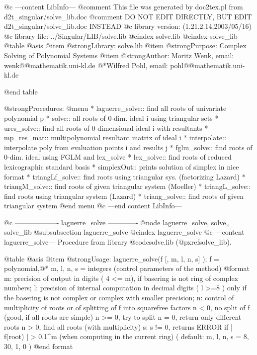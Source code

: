@c ---content LibInfo---
@comment This file was generated by doc2tex.pl from d2t_singular/solve_lib.doc
@comment DO NOT EDIT DIRECTLY, BUT EDIT d2t_singular/solve_lib.doc INSTEAD
@c library version: (1.21.2.14,2003/05/16)
@c library file: ../Singular/LIB/solve.lib
@cindex solve.lib
@cindex solve_lib
@table @asis
@item @strong{Library:}
solve.lib
@item @strong{Purpose:}
     Complex Solving of Polynomial Systems
@item @strong{Author:}
Moritz Wenk, email: wenk@@mathematik.uni-kl.de
@*Wilfred Pohl, email: pohl@@mathematik.uni-kl.de

@end table

@strong{Procedures:}
@menu
* laguerre_solve:: find all roots of univariate polynomial p
* solve:: all roots of 0-dim. ideal i using triangular sets
* ures_solve:: find all roots of 0-dimensional ideal i with resultants
* mp_res_mat:: multipolynomial resultant matrix of ideal i
* interpolate:: interpolate poly from evaluation points i and results j
* fglm_solve:: find roots of 0-dim. ideal using FGLM and lex_solve
* lex_solve:: find roots of reduced lexicographic standard basis
* simplexOut:: prints solution of simplex in nice format
* triangLf_solve:: find roots using triangular sys. (factorizing Lazard)
* triangM_solve:: find roots of given triangular system (Moeller)
* triangL_solve:: find roots using triangular system (Lazard)
* triang_solve:: find roots of given triangular system
@end menu
@c ---end content LibInfo---

@c ------------------- laguerre_solve -------------
@node laguerre_solve, solve,, solve_lib
@subsubsection laguerre_solve
@cindex laguerre_solve
@c ---content laguerre_solve---
Procedure from library @code{solve.lib} (@pxref{solve_lib}).

@table @asis
@item @strong{Usage:}
laguerre_solve(f [, m, l, n, s] ); f = polynomial,@*
m, l, n, s = integers (control parameters of the method)
@format
 m: precision of output in digits ( 4 <= m), if basering is not ring of 
      complex numbers;
 l: precision of internal computation in decimal digits ( l >=8 )
      only if the basering is not complex or complex with smaller precision;
 n: control of multiplicity of roots or of splitting of f into
      squarefree factors
      n < 0, no split of f (good, if all roots are simple)
      n >= 0, try to split
      n = 0, return only different roots
      n > 0, find all roots (with multiplicity)
 s: s != 0, returns ERROR if  | f(root) | > 0.1^m (when computing in the 
      current ring)
 ( default: m, l, n, s = 8, 30, 1, 0 )
@end format

